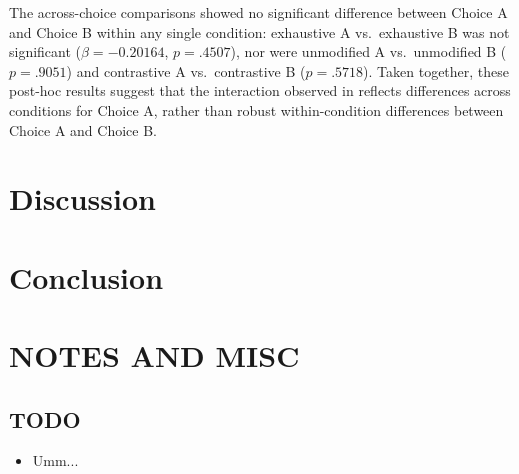 \documentclass[ruler]{CUP-JNL-LIN}%
\begin{document}
The across-choice comparisons showed no significant difference between Choice A and Choice B within any single condition: exhaustive A vs.\ exhaustive B was not significant ($\beta=-0.20164$, $p=.4507$), nor were unmodified A vs.\ unmodified B ($p=.9051$) and contrastive A vs.\ contrastive B ($p=.5718$). Taken together, these post-hoc results suggest that the interaction observed in reflects differences across conditions for Choice A, rather than robust within-condition differences between Choice A and Choice B.







\section{Discussion}
\label{sec:discussion}






\section{Conclusion}
\label{sec:conclusion}






\section{NOTES AND MISC}

\subsection{TODO}
\begin{itemize}
   \item Umm...
\end{itemize}
\end{document}
